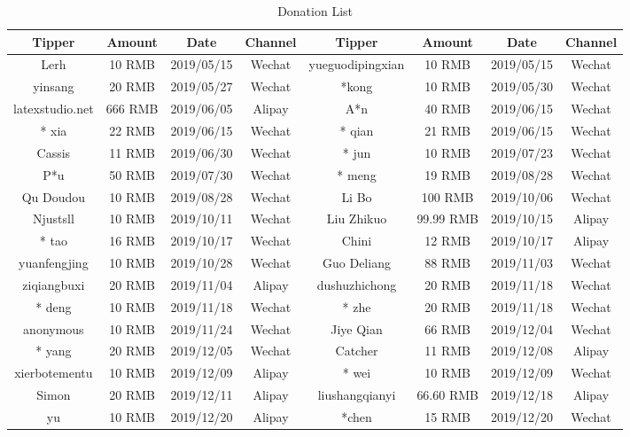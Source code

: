 \documentclass[en,hazy,screen,blue,14pt]{elegantnote}
\begin{document}
\begin{table}[htbp]
  \centering
  \scriptsize
  \caption{Donation List}
    \begin{tabular}{cccccccc}
    \toprule
    \textbf{Tipper} & \textbf{Amount} & \textbf{Date} & \textbf{Channel} & \textbf{Tipper} & \textbf{Amount} & \textbf{Date} & \textbf{Channel} \\
    \midrule
    Lerh  & 10 RMB & 2019/05/15 & Wechat    & yueguodipingxian & 10 RMB & 2019/05/15 & Wechat \\
	  yinsang    & 20 RMB & 2019/05/27 & Wechat    & *kong    & 10 RMB & 2019/05/30 & Wechat \\
	  latexstudio.net & 666 RMB & 2019/06/05 & Alipay   & A*n   & 40 RMB & 2019/06/15 & Wechat \\
	  * xia   & 22 RMB & 2019/06/15 & Wechat    & * qian  & 21 RMB  & 2019/06/15 & Wechat \\
	  Cassis & 11 RMB & 2019/06/30 & Wechat    & * jun    & 10 RMB & 2019/07/23 & Wechat \\
	  P*u   & 50 RMB & 2019/07/30 & Wechat    & * meng    & 19 RMB & 2019/08/28 & Wechat \\
	  Qu Doudou   & 10 RMB & 2019/08/28 & Wechat    & Li Bo    & 100 RMB & 2019/10/06 & Wechat \\
	  Njustsll & 10 RMB & 2019/10/11 & Wechat    & Liu Zhikuo   & 99.99 RMB & 2019/10/15 & Alipay \\
	  * tao   & 16 RMB & 2019/10/17 & Wechat    & Chini    & 12 RMB & 2019/10/17 & Alipay \\
	  yuanfengjing & 10 RMB & 2019/10/28 & Wechat    & Guo Deliang   & 88 RMB & 2019/11/03 & Wechat \\
	  ziqiangbuxi  & 20 RMB & 2019/11/04 & Alipay   & dushuzhichong  & 20 RMB & 2019/11/18 & Wechat \\
	  * deng    & 10 RMB & 2019/11/18 & Wechat    & * zhe   & 20 RMB & 2019/11/18 & Wechat \\
	  anonymous    & 10 RMB & 2019/11/24 & Wechat    & Jiye Qian & 66 RMB & 2019/12/04 & Wechat \\
	  * yang   & 20 RMB & 2019/12/05 & Wechat    & Catcher & 11 RMB & 2019/12/08 & Alipay \\
	  xierbotementu & 10 RMB & 2019/12/09 & Alipay   & * wei   & 10 RMB & 2019/12/09 & Wechat \\
	  Simon & 20 RMB & 2019/12/11 & Alipay   & liushangqianyi & 66.60 RMB & 2019/12/18 & Alipay \\
	  yu     & 10 RMB & 2019/12/20 & Alipay   & *chen   & 15 RMB & 2019/12/20 & Wechat \\

\end{tabular}
\end{table}
\end{document}
